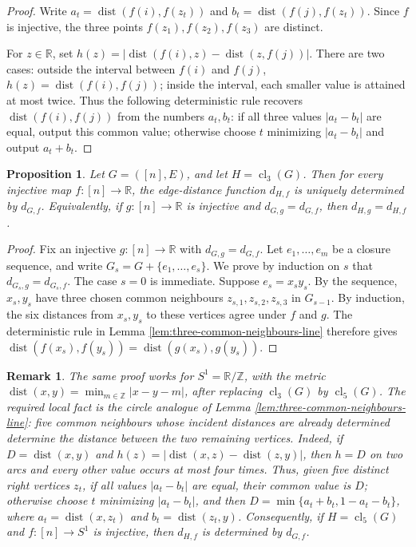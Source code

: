 \documentclass[fullpage,11pt]{article}
\providecommand{\dist}{\operatorname{dist}}
\theoremstyle{break}
\newtheorem{remark}[theorem]{Remark}
\newtheorem{proposition}[theorem]{Proposition}
\theoremstyle{definition}
\theoremstyle{break}
\begin{document}
\begin{proof}
    Write \(a_t=\dist(f(i),f(z_t))\) and \(b_t=\dist(f(j),f(z_t))\).
    Since \(f\) is injective, the three points \(f(z_1),f(z_2),f(z_3)\) are distinct.

    For \(z\in \mathbb R\), set \(h(z)=|\dist(f(i),z)-\dist(z,f(j))|\). There are two cases: outside the interval between \(f(i)\) and \(f(j)\), \(h(z)=\dist(f(i),f(j))\); inside the interval, each smaller value is attained at most twice. Thus the following deterministic rule recovers \(\dist(f(i),f(j))\) from the numbers \(a_t,b_t\): if all three values \(|a_t-b_t|\) are equal, output this common value; otherwise choose \(t\) minimizing \(|a_t-b_t|\) and output \(a_t+b_t\).
\end{proof}

\begin{proposition}\label{prop:line-closure-distances}
Let \(G=([n],E)\), and let \(H=\operatorname{cl}_3(G)\). Then for every injective map \(f\colon[n]\to\mathbb R\), the edge-distance function \(d_{H,f}\) is uniquely determined by \(d_{G,f}\). Equivalently, if \(g\colon[n]\to\mathbb R\) is injective and \(d_{G,g}=d_{G,f}\), then \(d_{H,g}=d_{H,f}\).
\end{proposition}

\begin{proof}
Fix an injective \(g\colon[n]\to\mathbb R\) with \(d_{G,g}=d_{G,f}\). Let \(e_1,\ldots,e_m\) be a closure sequence, and write \(G_s=G+\{e_1,\ldots,e_s\}\). We prove by induction on \(s\) that \(d_{G_s,g}=d_{G_s,f}\). The case \(s=0\) is immediate. Suppose \(e_s=x_sy_s\). By the sequence, \(x_s,y_s\) have three chosen common neighbours \(z_{s,1},z_{s,2},z_{s,3}\) in \(G_{s-1}\). By induction, the six distances from \(x_s,y_s\) to these vertices agree under \(f\) and \(g\). The deterministic rule in Lemma \ref{lem:three-common-neighbours-line} therefore gives \(\dist(f(x_s),f(y_s))=\dist(g(x_s),g(y_s))\).
\end{proof}

\begin{remark}\label{rem:circle-closure}
The same proof works for \(S^1=\mathbb R/\mathbb Z\), with the metric \(\dist(x,y)=\min_{m\in\mathbb Z}|x-y-m|\), after replacing \(\operatorname{cl}_3(G)\) by \(\operatorname{cl}_5(G)\). The required local fact is the circle analogue of Lemma \ref{lem:three-common-neighbours-line}: five common neighbours whose incident distances are already determined determine the distance between the two remaining vertices. Indeed, if \(D=\dist(x,y)\) and \(h(z)=|\dist(x,z)-\dist(z,y)|\), then \(h=D\) on two arcs and every other value occurs at most four times. Thus, given five distinct right vertices \(z_t\), if all values \(|a_t-b_t|\) are equal, their common value is \(D\); otherwise choose \(t\) minimizing \(|a_t-b_t|\), and then \(D=\min\{a_t+b_t,1-a_t-b_t\}\), where \(a_t=\dist(x,z_t)\) and \(b_t=\dist(z_t,y)\). Consequently, if \(H=\operatorname{cl}_5(G)\) and \(f\colon[n]\to S^1\) is injective, then \(d_{H,f}\) is determined by \(d_{G,f}\).
\end{remark}
\end{document}
